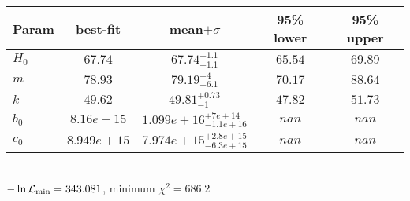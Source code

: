 \begin{tabular}{|l|c|c|c|c|} 
 \hline 
Param & best-fit & mean$\pm\sigma$ & 95\% lower & 95\% upper \\ \hline 
$H_{0 }$ &$67.74$ & $67.74_{-1.1}^{+1.1}$ & $65.54$ & $69.89$ \\ 
$m$ &$78.93$ & $79.19_{-6.1}^{+4}$ & $70.17$ & $88.64$ \\ 
$k$ &$49.62$ & $49.81_{-1}^{+0.73}$ & $47.82$ & $51.73$ \\ 
$b_{0 }$ &$8.16e+15$ & $1.099e+16_{-1.1e+16}^{+7e+14}$ & $nan$ & $nan$ \\ 
$c_{0 }$ &$8.949e+15$ & $7.974e+15_{-6.3e+15}^{+2.8e+15}$ & $nan$ & $nan$ \\ 
\hline 
 \end{tabular} \\ 
$-\ln{\cal L}_\mathrm{min} =343.081$, minimum $\chi^2=686.2$ \\ 
